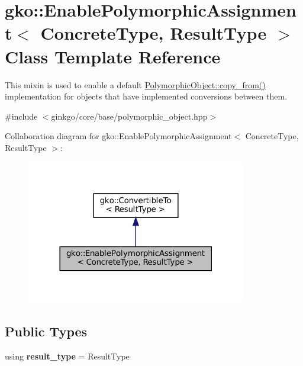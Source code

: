 \hypertarget{classgko_1_1EnablePolymorphicAssignment}{}\section{gko\+:\+:Enable\+Polymorphic\+Assignment$<$ Concrete\+Type, Result\+Type $>$ Class Template Reference}
\label{classgko_1_1EnablePolymorphicAssignment}


This mixin is used to enable a default \hyperlink{classgko_1_1PolymorphicObject_a5e6f713938293cfbe788d00480eb4d81}{Polymorphic\+Object\+::copy\+\_\+from()} implementation for objects that have implemented conversions between them.  




{\ttfamily \#include $<$ginkgo/core/base/polymorphic\+\_\+object.\+hpp$>$}



Collaboration diagram for gko\+:\+:Enable\+Polymorphic\+Assignment$<$ Concrete\+Type, Result\+Type $>$\+:
\nopagebreak
\begin{figure}[H]
\begin{center}
\leavevmode
\includegraphics[width=272pt]{classgko_1_1EnablePolymorphicAssignment__coll__graph}
\end{center}
\end{figure}
\subsection*{Public Types}
\begin{DoxyCompactItemize}
\item 
\mbox{\label{classgko_1_1EnablePolymorphicAssignment_a2e92aa4e8262a8f6625330b76a24deeb}} 
using {\bfseries result\+\_\+type} = Result\+Type
\end{DoxyCompactItemize}
